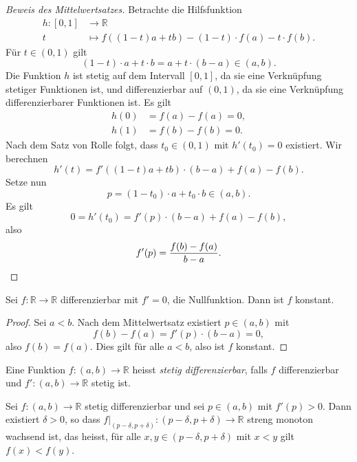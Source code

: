 \documentclass[../main.tex]{subfiles}
\begin{document}
\begin{proof}[Beweis des Mittelwertsatzes]
  Betrachte die Hilfsfunktion 
  \begin{align*}
    h \colon [0, 1] & \to \mathbb{R} \\
    t & \mapsto f((1- t)a + tb) - (1-t) \cdot f(a) - t\cdot f(b).
  \end{align*}
  Für $t \in (0, 1)$ gilt
  \[
    (1- t) \cdot a + t \cdot b = a + t \cdot (b-a) \in (a, b).
  \]
  Die Funktion $h$ ist stetig auf dem Intervall $[0, 1]$,
  da sie eine Verknüpfung stetiger Funktionen ist,
  und differenzierbar auf $(0, 1)$, da sie eine Verknüpfung
  differenzierbarer Funktionen ist.
  Es gilt
  \begin{align*}
    h(0) &= f(a) - f(a) = 0,\\
    h(1) & = f(b) - f(b) = 0.
  \end{align*}
  Nach dem Satz von Rolle folgt, dass
  $t_0 \in (0, 1)$ mit $h'(t_0) = 0$ 
  existiert.
  Wir berechnen \[
    h'(t)  = f'((1-t)a + tb) \cdot (b-a) 
  + f(a) - f(b). \]
  Setze nun
  \[
    p = (1- t_0) \cdot a + t_0 \cdot b \in (a, b).
  \]
  Es gilt
  \[
    0 = h'(t_0) = f'(p) \cdot (b-a) + f(a) - f(b),
  \]
  also
  \[
    f'(p) = \frac{f(b) - f(a)}{b-a}. \qedhere
  \]
\end{proof}

\begin{corollary}
  Sei $f \colon \mathbb{R} \to \mathbb{R}$ differenzierbar
  mit $f' = 0$, die Nullfunktion.
  Dann ist $f$ konstant.
\end{corollary}

\begin{proof}
  Sei $a < b$. Nach dem Mittelwertsatz
  existiert $p \in (a, b)$ mit
  \[
    f(b) - f(a) = f'(p) \cdot (b-a) = 0,
  \]
  also $f(b) = f(a)$.
  Dies gilt für alle $a < b$, also
  ist $f$ konstant.
\end{proof}

\begin{definition}
  Eine Funktion $f \colon (a, b) \to \mathbb{R}$ 
  heisst \emph{stetig differenzierbar}, falls
  $f$ differenzierbar und $f' \colon (a, b) \to \mathbb{R}$ 
  stetig ist.
\end{definition}


\begin{corollary}\label{cor:strictly-monotone}
  Sei $f \colon (a, b) \to \mathbb{R}$ 
  stetig differenzierbar und sei
  $p \in (a, b)$ mit $f'(p) > 0$.
  Dann existiert $\delta > 0$,
  so dass $f|_{(p- \delta, p + \delta)}
  \colon (p - \delta, p + \delta) \to \mathbb{R}$ 
  streng monoton wachsend ist,
  das heisst, für alle $x, y \in (p - \delta, p + \delta)$ 
  mit $x < y$ gilt
  $f(x) < f(y)$.
\end{corollary}
\end{document}
